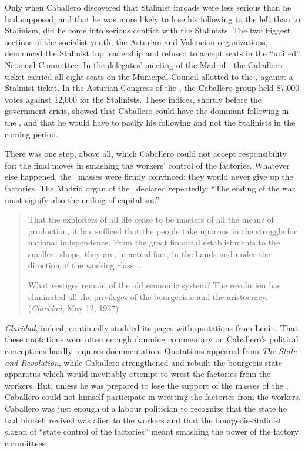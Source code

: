 Only when Caballero discovered that Stalinist inroads were less serious than he had supposed, and that he was more likely to lose his following to the left than to Stalinism, did he come into serious conflict with the Stalinists. The two biggest sections of the socialist youth, the Asturian and Valencian organizations, denounced the Stalinist top leadership and refused to accept seats in the ``united'' National Committee. In the delegates’ meeting of the Madrid \UGT, the Caballero ticket carried all eight seats on the Municipal Council allotted to the \UGT, against a Stalinist ticket. In the Asturian Congress of the \UGT, the Caballero group held 87,000 votes against 12,000 for the Stalinists. These indices, shortly before the government crisis, showed that Caballero could have the dominant following in the \UGT, and that he would have to pacify his following and not the Stalinists in the coming period.

There was one step, above all, which Caballero could not accept responsibility for: the final moves in smashing the workers’ control of the factories. Whatever else happened, the \UGT\ masses were firmly convinced; they would never give up the factories. The Madrid organ of the \UGT\ declared repeatedly: ``The ending of the war must signify also the ending of capitalism.''
\nowidow

\begin{quotation}
  That the exploiters of all life cease to be masters of all the means of production, it has sufficed that the people take up arms in the struggle for national independence. From the great financial establishments to the smallest shops, they are, in actual fact, in the hands and under the direction of the working class \dots
  
  What vestiges remain of the old economic system? The revolution has eliminated all the privileges of the bourgeoisie and the aristocracy. (\emph{Claridad}, May 12, 1937)
\end{quotation}

\emph{Claridad}, indeed, continually studded its pages with quotations from Lenin. That these quotations were often enough damning commentary on Caballero’s political conceptions hardly requires documentation. Quotations appeared from \emph{The State and Revolution}, while Caballero strengthened and rebuilt the bourgeois state apparatus which would inevitably attempt to wrest the factories from the workers. But, unless he was prepared to lose the support of the masses of the \UGT, Caballero could not himself participate in wresting the factories from the workers. Caballero was just enough of a labour politician to recognize that the state he had himself revived was alien to the workers and that the bourgeois-Stalinist slogan of ``state control of the factories'' meant smashing the power of the factory committees.

